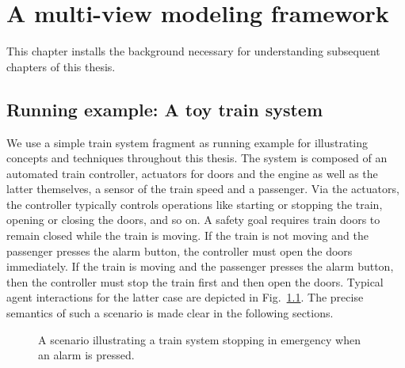 \chapter{A multi-view modeling framework\label{chapter:framework}}

This chapter installs the background necessary for understanding subsequent chapters of this thesis. 

\newcommand{\artifact}[1]{\texttt{#1}}

\section{Running example: A toy train system}

We use a simple train system fragment as running example for illustrating concepts and techniques throughout this thesis. The system is composed of an automated train controller, actuators for doors and the engine as well as the latter themselves, a sensor of the train speed and a passenger. Via the actuators, the controller typically controls operations like starting or stopping the train, opening or closing the doors, and so on. A safety goal requires train doors to remain closed while the train is moving. If the train is not moving and the passenger presses the alarm button, the controller must open the doors immediately. If the train is moving and the passenger presses the alarm button, then the controller must stop the train first and then open the doors. Typical agent interactions for the latter case are depicted in Fig.~\ref{image:train-scenario-all-agents}. The precise semantics of such a scenario is made clear in the following sections.

\begin{figure}[H]\centering
{}
\caption{A scenario illustrating a train system stopping in emergency when an alarm is pressed.\label{image:train-scenario-all-agents}}
\end{figure}

